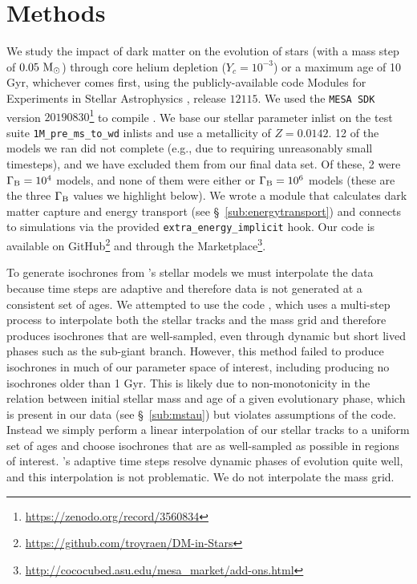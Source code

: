 \documentclass[useAMS,usenatbib]{mnras}
\begin{document}
\section{Methods}
\label{sec:methods}

We study the impact of dark matter on the evolution of \mrange stars (with a mass step of $0.05 \ \mathrm{M}_{\odot}$) through core helium depletion ($Y_c = 10^{-3}$) or a maximum age of 10 Gyr, whichever comes first, using the publicly-available code 
Modules for Experiments in Stellar Astrophysics \citep[\mesa,][]{Paxton2011ModulesMESA, Paxton2013, Paxton2015, Paxton2018, Paxton2019}, 
release $12115$. 
We used the \texttt{MESA SDK} version $20190830$\footnote{\url{https://zenodo.org/record/3560834}} to compile \mesa.
We base our stellar parameter inlist on the \mesa test suite \texttt{1M\_pre\_ms\_to\_wd} inlists and use a metallicity of $Z = 0.0142$. 12 of the models we ran did not complete (e.g., due to requiring unreasonably small timesteps), and we have excluded them from our final data set. Of these, 2 were $\Gamma_\mathrm{B} = 10^{4}$ models, and none of them were either \nodm or $\Gamma_\mathrm{B} = 10^{6}$ models (these are the three $\Gamma_\mathrm{B}$ values we highlight below). We wrote a module that calculates dark matter capture and energy transport (see \S~\ref{sub:energytransport}) and connects to \mesa simulations via the provided \texttt{extra\_energy\_implicit} hook. Our code is available on GitHub\footnote{\url{https://github.com/troyraen/DM-in-Stars}} and through the \mesa Marketplace\footnote{\url{http://cococubed.asu.edu/mesa_market/add-ons.html}}.

To generate isochrones from \mesa's stellar models we must interpolate the data because time steps are adaptive and therefore data is not generated at a consistent set of ages.
We attempted to use the \mist code \citep[\mesa Isochrones and Stellar Tracks,][]{Dotter2016MesaIsochrones, Choi2016MESAModels}, which uses a multi-step process to interpolate both the stellar tracks and the mass grid and therefore produces isochrones that are well-sampled, even through dynamic but short lived phases such as the sub-giant branch. However, this method failed to produce isochrones in much of our parameter space of interest, including producing no isochrones older than 1 Gyr. This is likely due to non-monotonicity in the relation between initial stellar mass and age of a given evolutionary phase, which is present in our data (see \S~\ref{sub:mstau}) but violates assumptions of the code. Instead we simply perform a linear interpolation of our stellar tracks to a uniform set of ages and choose isochrones that are as well-sampled as possible in regions of interest. \mesa's adaptive time steps resolve dynamic phases of evolution quite well, and this interpolation is not problematic. We do not interpolate the mass grid. 
\end{document}

